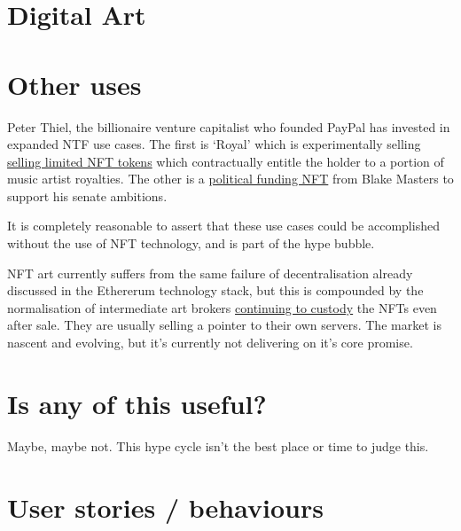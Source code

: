 
\section{Digital Art}


\section{Other uses}
Peter Thiel, the billionaire venture capitalist who founded PayPal has invested in expanded NTF use cases. The first is `Royal' which is experimentally  selling \href{https://royal.io/}{selling limited NFT tokens} which contractually entitle the holder to a portion of music artist royalties. The other is a \href{https://www.ztonft.com/}{political funding NFT} from Blake Masters to support his senate ambitions.

It is completely reasonable to assert that these use cases could be accomplished without the use of NFT technology, and is part of the hype bubble.

NFT art currently suffers from the same failure of decentralisation already discussed in the Ethererum technology stack, but this is compounded by the normalisation of intermediate art brokers \href{https://moxie.org/2022/01/07/web3-first-impressions.html}{continuing to custody} the NFTs even after sale. They are usually selling a pointer to their own servers. The market is nascent and evolving, but it's currently not delivering on it's core promise.

\section{Is any of this useful?}
Maybe, maybe not. This hype cycle isn't the best place or time to judge this.
\section{User stories / behaviours}
\label{behaviours}

